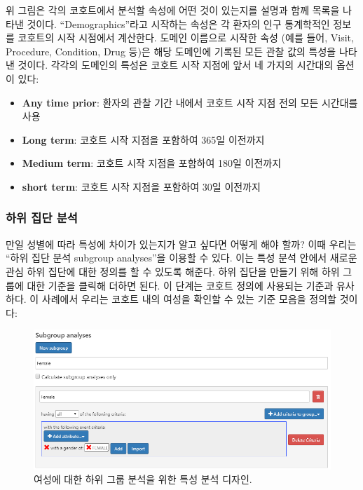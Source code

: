 \documentclass[10.5pt]{book}
\theoremstyle{definition}
\theoremstyle{definition}
\theoremstyle{definition}
\theoremstyle{remark}
\begin{document}
위 그림은 각의 코호트에서 분석할 속성에 어떤 것이 있는지를 설명과 함께
목록을 나타낸 것이다. ``Demographics''라고 시작하는 속성은 각 환자의
인구 통계학적인 정보를 코호트의 시작 시점에서 계산한다. 도메인 이름으로
시작한 속성 (예를 들어, Visit, Procedure, Condition, Drug 등)은 해당
도메인에 기록된 모든 관찰 값의 특성을 나타낸 것이다. 각각의 도메인의
특성은 코호트 시작 지점에 앞서 네 가지의 시간대의 옵션이 있다:

\begin{itemize}
\item
  \textbf{Any time prior}: 환자의 관찰 기간 내에서 코호트 시작 지점 전의
  모든 시간대를 사용
\item
  \textbf{Long term}: 코호트 시작 지점을 포함하여 365일 이전까지
\item
  \textbf{Medium term}: 코호트 시작 지점을 포함하여 180일 이전까지
\item
  \textbf{short term}: 코호트 시작 지점을 포함하여 30일 이전까지
\end{itemize}

\subsubsection*{하위 집단 분석}\label{--}

만일 성별에 따라 특성에 차이가 있는지가 알고 싶다면 어떻게 해야 할까?
이때 우리는 ``하위 집단 분석 subgroup analyses''을 이용할 수 있다. 이는
특성 분석 안에서 새로운 관심 하위 집단에 대한 정의를 할 수 있도록
해준다. 하위 집단을 만들기 위해 하위 그룹에 대한 기준을 클릭해 더하면
된다. 이 단계는 코호트 정의에 사용되는 기준과 유사하다. 이 사례에서
우리는 코호트 내의 여성을 확인할 수 있는 기준 모음을 정의할 것이다:

\begin{figure}

{\centering \includegraphics[width=1\linewidth]{images/Characterization/atlasCharacterizationSubgroup} 

}

\caption{여성에 대한 하위 그룹 분석을 위한 특성 분석 디자인.}\label{fig:atlasCharacterizationSubgroup}
\end{figure}
\end{document}

